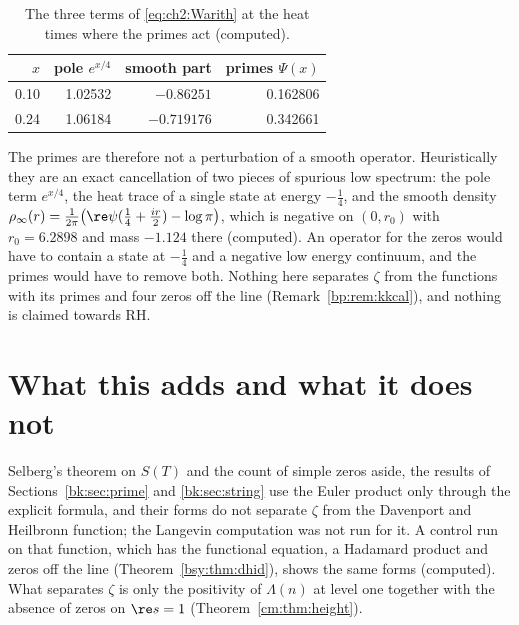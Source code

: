 \begin{table}[ht]
\centering
\small
\begin{tabular}{rrrr}
\toprule
$x$ & pole $e^{x/4}$ & smooth part & primes $\Psi(x)$\\
\midrule
0.10 & 1.02532 & $-0.86251$ & 0.162806\\
0.24 & 1.06184 & $-0.719176$ & 0.342661\\
\bottomrule
\end{tabular}
\caption{The three terms of \eqref{eq:ch2:Warith} at the heat times where the primes act (computed).}\label{bk:tab:born}
\end{table}

The primes are therefore not a perturbation of a smooth operator. Heuristically they are an exact cancellation of two pieces of spurious low spectrum: the pole term $e^{x/4}$, the heat trace of a single state at energy $-\frac14$, and the smooth density $\rho_\infty(r)=\frac1{2\pi}\big(\re\psi(\frac14+\frac{ir}2)-\log\pi\big)$, which is negative on $(0,r_0)$ with $r_0=6.2898$ and mass $-1.124$ there (computed). An operator for the zeros would have to contain a state at $-\frac14$ and a negative low energy continuum, and the primes would have to remove both. Nothing here separates $\zeta$ from the functions with its primes and four zeros off the line (Remark~\ref{bp:rem:kkcal}), and nothing is claimed towards RH.

\section{What this adds and what it does not}\label{bk:sec:close}

Selberg's theorem on $S(T)$ and the count of simple zeros aside, the results of Sections~\ref{bk:sec:prime} and \ref{bk:sec:string} use the Euler product only through the explicit formula, and their forms do not separate $\zeta$ from the Davenport and Heilbronn function; the Langevin computation was not run for it. A control run on that function, which has the functional equation, a Hadamard product and zeros off the line (Theorem~\ref{bsy:thm:dhid}), shows the same forms (computed). What separates $\zeta$ is only the positivity of $\Lambda(n)$ at level one together with the absence of zeros on $\re s=1$ (Theorem~\ref{cm:thm:height}).